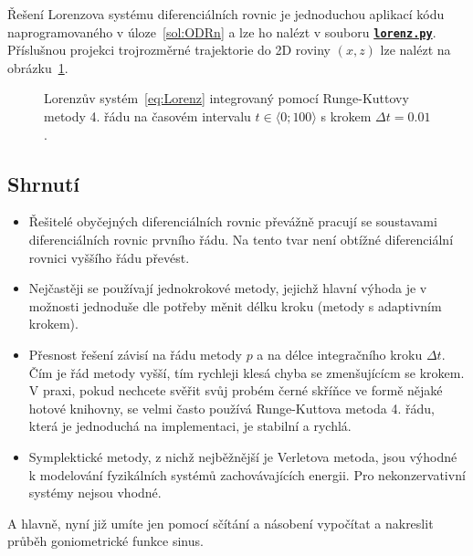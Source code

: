 \documentclass[a4paper,11pt,twoside]{article}
\def\ghfile#1#2{\textnormal{\textbf{\texttt{\href{https://github.com/PavelStransky/PCInPhysics2021/blob/main/#1#2}{#2}}}}}
\theoremstyle{red}
\theoremstyle{green}
\begin{document}
\begin{solution}
    Řešení Lorenzova systému diferenciálních rovnic je jednoduchou aplikací kódu naprogramovaného v úloze~\ref{sol:ODRn} a lze ho nalézt v souboru \ghfile{python/ode/}{lorenz.py}.
    Příslušnou projekci trojrozměrné trajektorie do 2D roviny $(x,z)$ lze nalézt na obrázku~\ref{fig:Lorenz}.

    \begin{figure}[!htbp]
        \centering
        \caption{
            \protect\small
                Lorenzův systém~\eqref{eq:Lorenz} integrovaný pomocí Runge-Kuttovy metody 4. řádu na časovém intervalu $t\in\langle0;100\rangle$ s krokem $\Delta t=0.01$.
            }	
        \label{fig:Lorenz}
    \end{figure}
\end{solution}

\subsection{Shrnutí}
\begin{itemize}
\item 
    Řešitelé obyčejných diferenciálních rovnic převážně pracují se soustavami diferenciálních rovnic prvního řádu.
    Na tento tvar není obtížné diferenciální rovnici vyššího řádu převést.

\item
    Nejčastěji se používají jednokrokové metody, jejichž hlavní výhoda je v možnosti jednoduše dle potřeby měnit délku kroku (metody s adaptivním krokem).

\item 
    Přesnost řešení závisí na řádu metody $p$ a na délce integračního kroku $\Delta t$.
    Čím je řád metody vyšší, tím rychleji klesá chyba se zmenšujícícm se krokem.
    V praxi, pokud nechcete svěřit svůj probém černé skříňce ve formě nějaké hotové knihovny, se velmi často používá Runge-Kuttova metoda 4. řádu, která je jednoduchá na implementaci, je stabilní a rychlá.

\item
    Symplektické metody, z nichž nejběžnější je Verletova metoda, jsou výhodné k modelování fyzikálních systémů zachovávajících energii.
    Pro nekonzervativní systémy nejsou vhodné. 
\end{itemize}
A hlavně, nyní již umíte jen pomocí sčítání a násobení vypočítat a nakreslit průběh goniometrické funkce sinus.
\end{document}
